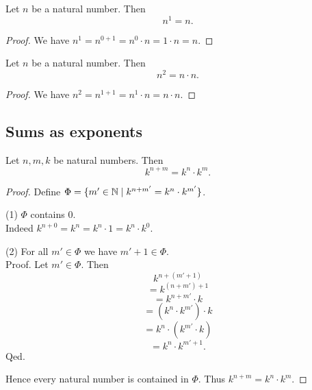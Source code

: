 \documentclass[../arithmetic.tex]{subfiles}
\begin{document}
  \begin{forthel}
    \begin{proposition}
      Let $n$ be a natural number.
      Then \[ n^{1} = n. \]
    \end{proposition}
    \begin{proof}
      We have $n^{1}
        = n^{0 + 1}
        = n^{0} \cdot n
        = 1 \cdot n
        = n$.
    \end{proof}
  \end{forthel}

  \begin{forthel}
    \begin{proposition}
      Let $n$ be a natural number.
      Then \[ n^{2} = n \cdot n. \]
    \end{proposition}
    \begin{proof}
      We have $n^{2}
        = n^{1 + 1}
        = n^{1} \cdot n
        = n \cdot n$.
    \end{proof}
  \end{forthel}


  \subsection*{Sums as exponents}

  \begin{forthel}
    \begin{proposition}
      Let $n, m, k$ be natural numbers.
      Then \[ k^{n + m} = k^{n} \cdot k^{m}. \]
    \end{proposition}
    \begin{proof}
      Define $\Phi = \{ m' \in \mathbb{N} \mid k^{n + m'} = k^{n} \cdot k^{m'} \}$.

      (1) $\Phi$ contains $0$. \\
      Indeed $k^{n + 0}
        = k^{n}
        = k^{n} \cdot 1
        = k^{n} \cdot k^{0}$.

      (2) For all $m' \in \Phi$ we have $m' + 1 \in \Phi$. \\
      Proof.
        Let $m' \in \Phi$.
        Then
        \[  k^{n + (m' + 1)}                  \]
        \[    = k^{(n + m') + 1}              \]
        \[    = k^{n + m'} \cdot k            \]
        \[    = (k^{n} \cdot k^{m'}) \cdot k  \]
        \[    = k^{n} \cdot (k^{m'} \cdot k)  \]
        \[    = k^{n} \cdot k^{m' + 1}.       \]
      Qed.

      Hence every natural number is contained in $\Phi$.
      Thus $k^{n + m} = k^{n} \cdot k^{m}$.
    \end{proof}
  \end{forthel}
\end{document}
